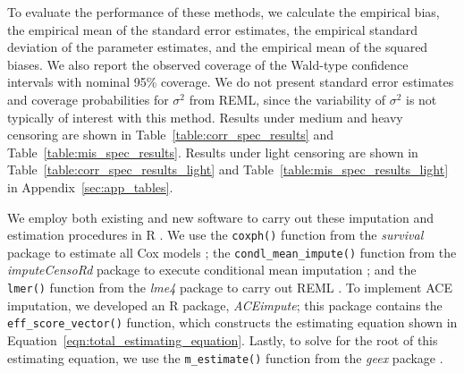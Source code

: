 \documentclass[12pt]{article}
\begin{document}
    

To evaluate the performance of these methods, we calculate the empirical bias, the empirical mean of the standard error estimates, the empirical standard deviation of the parameter estimates, and the empirical mean of the squared biases. We also report the observed coverage of the Wald-type confidence intervals with nominal 95\% coverage. We do not present standard error estimates and coverage probabilities for $\sigma^2$ from REML, since the variability of $\sigma^2$ is not typically of interest with this method. Results under medium and heavy censoring are shown in Table~\ref{table:corr_spec_results} and Table~\ref{table:mis_spec_results}. Results under light censoring are shown in Table~\ref{table:corr_spec_results_light} and Table~\ref{table:mis_spec_results_light} in Appendix~\ref{sec:app_tables}.

We employ both existing and new software to carry out these imputation and estimation procedures in R \citep{R-lang}. We use the  {\tt coxph()} function from the \textit{survival} package to estimate all Cox models \citep{survival-package}; the
{\tt condl\_mean\_impute()} function from the \textit{imputeCensoRd} package to execute conditional mean imputation  \citep{correctingCMI}; and the {\tt lmer()} function from the \textit{lme4} package to carry out REML \citep{lme4}. To implement ACE imputation, we developed an R package, \textit{ACEimpute}; this package contains the {\tt eff\_score\_vector()} function, which constructs the estimating equation shown in Equation~\eqref{eqn:total_estimating_equation}. Lastly, to solve for the root of this estimating equation, we use the {\tt m\_estimate()} function from the \textit{geex} package \citep{Saul2020geex}.
\end{document}
